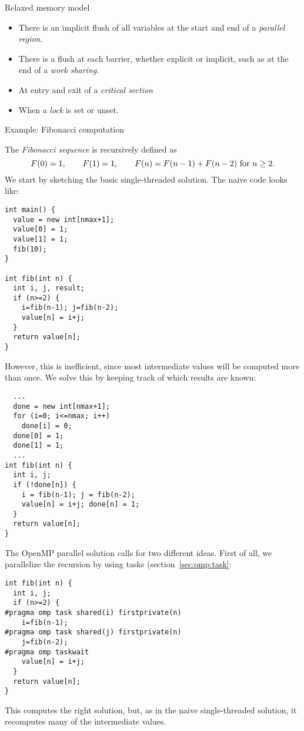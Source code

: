 
 {Relaxed memory model}
\label{sec:omp:flush}


\begin{itemize}
\item There is an implicit flush of all variables at the start and end 
  of a \emph{parallel region}.
\item There is a flush at each barrier, whether explicit or implicit,
  such as at the end of a
  \emph{work sharing}.
\item At entry and exit of a
  \emph{critical section}
\item When a \emph{lock} is set or unset.
\end{itemize}

 {Example: Fibonacci computation}

The \emph{Fibonacci sequence} is recursively defined as
\[ F(0)=1,\qquad F(1)=1,\qquad F(n)=F(n-1)+F(n-2)
\hbox{ for $n\geq2$}.
\]
We start by sketching the basic single-threaded solution.
The naive code looks like:
\begin{lstlisting}
int main() {
  value = new int[nmax+1];
  value[0] = 1;
  value[1] = 1;
  fib(10);
}

int fib(int n) {
  int i, j, result;
  if (n>=2) {
    i=fib(n-1); j=fib(n-2);
    value[n] = i+j;
  }
  return value[n];
}
\end{lstlisting}
However, this is inefficient, since most intermediate values will be computed
more than once. We solve this by keeping track of which results are known:
\begin{lstlisting}
  ...
  done = new int[nmax+1];
  for (i=0; i<=nmax; i++)
    done[i] = 0;
  done[0] = 1;
  done[1] = 1;
  ...
int fib(int n) {
  int i, j;
  if (!done[n]) {
    i = fib(n-1); j = fib(n-2);
    value[n] = i+j; done[n] = 1;
  }
  return value[n];
}
\end{lstlisting}
The OpenMP parallel solution calls for two different ideas. First of all,
we parallelize the recursion by using tasks (section~\ref{sec:omp:task}:
\begin{lstlisting}
int fib(int n) {
  int i, j;
  if (n>=2) {
#pragma omp task shared(i) firstprivate(n)
    i=fib(n-1);
#pragma omp task shared(j) firstprivate(n)
    j=fib(n-2);
#pragma omp taskwait
    value[n] = i+j;
  }
  return value[n];
}
\end{lstlisting}
This computes the right solution, but, as in the naive single-threaded solution,
it recomputes many of the intermediate values.

